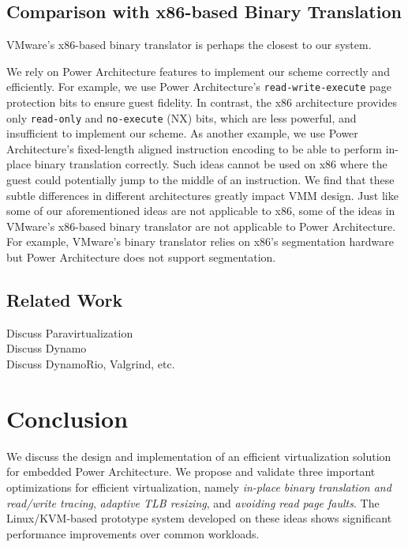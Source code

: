 \documentclass[10pt,twocolumn]{article}
\begin{document}
\subsection{Comparison with x86-based Binary Translation}
VMware's x86-based binary translator\cite{agesen:comparison} is perhaps the closest
to our system.

We rely on Power Architecture features to implement our
scheme correctly and efficiently. For example, we use
Power Architecture's {\tt read-write-execute} page protection bits to ensure guest
fidelity. In contrast, the x86 architecture provides only {\tt read-only} and
{\tt no-execute} (NX) bits, which are less powerful, and insufficient
to implement our scheme. As another
example, we use Power
Architecture's fixed-length aligned instruction encoding to be able to
perform in-place binary translation correctly. Such ideas cannot be used
on x86 where the guest could potentially jump to the middle of an instruction.
We find that these subtle
differences in different architectures greatly impact VMM design. Just like some
of our aforementioned ideas are not applicable to
x86, some of the ideas in VMware's x86-based binary translator
are not applicable to Power Architecture. For example, VMware's binary translator
relies on x86's segmentation hardware but Power Architecture does not
support segmentation.

\subsection{Related Work}
Discuss Paravirtualization\\
Discuss Dynamo\\
Discuss DynamoRio, Valgrind, etc.\\
\section{Conclusion}
We discuss the design and implementation of an efficient virtualization solution
for embedded Power Architecture. We propose and validate three important optimizations
for efficient virtualization, namely {\em in-place binary translation and read/write
tracing}, {\em adaptive TLB resizing}, and {\em avoiding read page faults}. 
The Linux/KVM-based prototype system developed on these ideas shows significant
performance improvements over common workloads.


\end{document}
